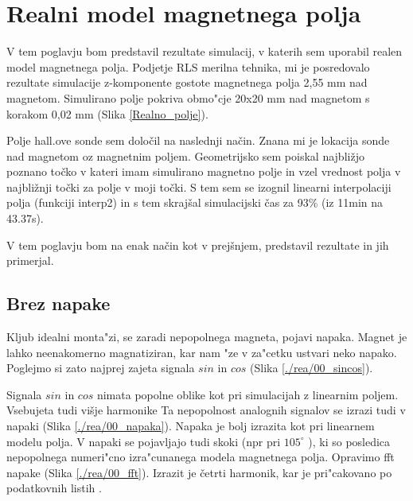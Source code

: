 

\chapter{Realni model magnetnega polja}

V tem poglavju bom predstavil rezultate simulacij, v katerih sem uporabil realen model magnetnega polja. Podjetje RLS merilna tehnika, mi je posredovalo rezultate simulacije z-komponente gostote magnetnega polja 2,55 mm nad magnetom.  Simulirano polje pokriva obmo"cje 20x20 mm nad magnetom s korakom 0,02 mm (Slika \ref{Realno_polje}).

Polje hall.ove sonde  sem določil na naslednji način. Znana mi je lokacija sonde nad magnetom oz magnetnim poljem. Geometrijsko sem poiskal najbližjo poznano točko v kateri imam simulirano magnetno polje in vzel vrednost polja v najbližnji točki za polje v moji točki. S tem sem se izognil linearni interpolaciji polja (funkciji interp2) in s tem skrajšal simulacijski čas za 93\% (iz 11min na 43.37s).

V tem poglavju bom na enak način kot v prejšnjem, predstavil rezultate in jih primerjal.

\section{Brez napake}
Kljub idealni monta"zi, se zaradi nepopolnega magneta, pojavi napaka. Magnet je lahko neenakomerno magnatiziran, kar nam "ze v za"cetku ustvari neko napako.
Poglejmo si zato najprej zajeta signala $sin$ in $cos$ (Slika \ref{./rea/00_sincos}).

Signala $sin$ in $cos$ nimata popolne oblike kot pri simulacijah z linearnim poljem. Vsebujeta tudi višje harmonike Ta nepopolnost analognih signalov se izrazi tudi v napaki (Slika \ref{./rea/00_napaka}).
Napaka je bolj izrazita kot pri linearnem modelu polja. V napaki se pojavljajo tudi skoki (npr pri $105^{\circ}$ ), ki so posledica nepopolnega numeri"cno izra"cunanega modela magnetnega polja.
Opravimo fft napake (Slika \ref{./rea/00_fft}).
Izrazit je četrti harmonik, kar je pri"cakovano po podatkovnih listih \cite{AM8192}.




